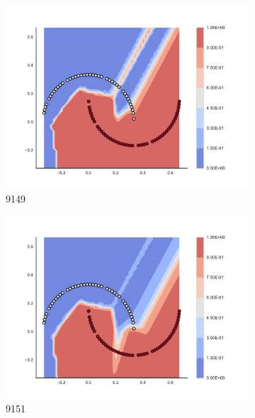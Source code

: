\begin{figure}[h]
\begin{subfigure}[b]{0.09\textwidth}
    \includegraphics[clip, trim=2.35cm 1.75cm 4.5cm 0cm,width=\textwidth]{img/convergence/9149.pdf}
    \caption{9149}
    \label{fig:convergence_9149}
\end{subfigure}
%
\begin{subfigure}[b]{0.09\textwidth}
    \includegraphics[clip, trim=2.35cm 1.75cm 4.5cm 0cm,width=\textwidth]{img/convergence/9151.pdf}
    \caption{9151}
    \label{fig:convergence_9151}
\end{subfigure}
%
\begin{subfigure}[b]{0.09\textwidth}

\end{subfigure}
\end{figure}

